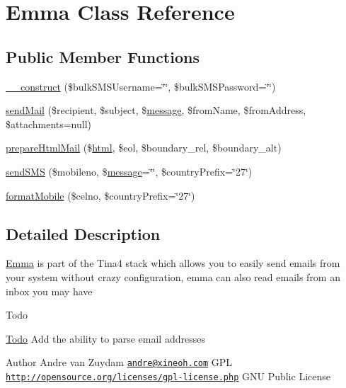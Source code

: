 \hypertarget{classEmma}{}\section{Emma Class Reference}
\label{classEmma}
\subsection*{Public Member Functions}
\begin{DoxyCompactItemize}
\item 
\hyperlink{classEmma_a41ce44cec1c4b79421b8fe2f0c9dc6b6}{\+\_\+\+\_\+construct} (\$bulk\+S\+M\+S\+Username=\char`\"{}\char`\"{}, \$bulk\+S\+M\+S\+Password=\char`\"{}\char`\"{})
\item 
\hyperlink{classEmma_ada88e77bd691cedb6e8ba447d62761f1}{send\+Mail} (\$recipient, \$subject, \$\hyperlink{Tessa_8php_a37ab31c170417027f819bfc053d7cd39}{message}, \$from\+Name, \$from\+Address, \$attachments=null)
\item 
\hyperlink{classEmma_ac39507bf1f8d7fd5d5120d2f46910df1}{prepare\+Html\+Mail} (\$\hyperlink{Shape_8php_a8b267aa0adca2018097f6f6f4c804d46}{html}, \$eol, \$boundary\+\_\+rel, \$boundary\+\_\+alt)
\item 
\hyperlink{classEmma_adc96eb73ee69ddd33531cd0255ec5c07}{send\+S\+M\+S} (\$mobileno, \$\hyperlink{Tessa_8php_a37ab31c170417027f819bfc053d7cd39}{message}=\char`\"{}\char`\"{}, \$country\+Prefix=\char`\"{}27\char`\"{})
\item 
\hyperlink{classEmma_a7430964a12c547127331eaf2c8fd3a37}{format\+Mobile} (\$celno, \$country\+Prefix=\char`\"{}27\char`\"{})
\end{DoxyCompactItemize}


\subsection{Detailed Description}
\hyperlink{classEmma}{Emma} is part of the Tina4 stack which allows you to easily send emails from your system without crazy configuration, emma can also read emails from an inbox you may have \begin{DoxyRefDesc}{Todo}
\item[\hyperlink{todo__todo000003}{Todo}]Add the ability to parse email addresses\end{DoxyRefDesc}


\begin{DoxyAuthor}{Author}
Andre van Zuydam \href{mailto:andre@xineoh.com}{\tt andre@xineoh.\+com}  G\+P\+L  \href{http://opensource.org/licenses/gpl-license.php}{\tt http\+://opensource.\+org/licenses/gpl-\/license.\+php} G\+N\+U Public License 
\end{DoxyAuthor}


